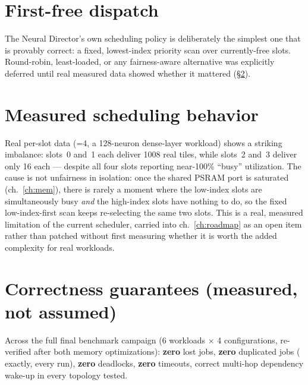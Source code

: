\section{First-free dispatch}
The Neural Director's own scheduling policy is deliberately the simplest
one that is provably correct: a fixed, lowest-index priority scan over
currently-free slots. Round-robin, least-loaded, or any fairness-aware
alternative was explicitly deferred until real measured data showed
whether it mattered (\S\ref{sec:fairness}).

\section{Measured scheduling behavior}
\label{sec:fairness}
Real per-slot data (=4, a 128-neuron dense-layer
workload) shows a striking imbalance: slots~0 and~1 each deliver 1008
real tiles, while slots~2 and~3 deliver only 16 each --- despite all four
slots reporting near-100\% ``busy'' utilization. The cause is not
unfairness in isolation: once the shared PSRAM port is saturated
(ch.~\ref{ch:mem}), there is rarely a moment where the low-index slots
are simultaneously busy \emph{and} the high-index slots have nothing to
do, so the fixed low-index-first scan keeps re-selecting the same two
slots. This is a real, measured limitation of the current scheduler,
carried into ch.~\ref{ch:roadmap} as an open item rather than patched
without first measuring whether it is worth the added complexity for
real workloads.

\section{Correctness guarantees (measured, not assumed)}
Across the full final benchmark campaign (6 workloads $\times$ 4
 configurations, re-verified after both memory
optimizations): \textbf{zero} lost jobs, \textbf{zero} duplicated jobs
( exactly,
every run), \textbf{zero} deadlocks, \textbf{zero} timeouts, correct
multi-hop dependency wake-up in every topology tested.
